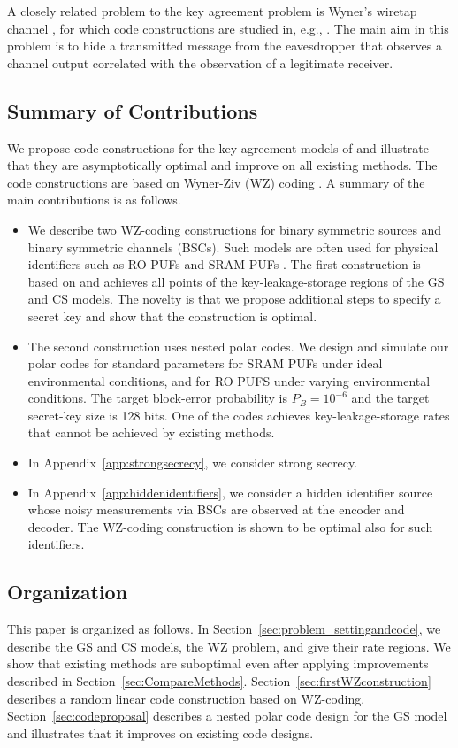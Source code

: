\documentclass[journal,10pt,twoside]{IEEEtran}
\begin{document}
A closely related problem to the key agreement problem is Wyner's wiretap channel \cite{WynerWTC}, for which code constructions are studied in, e.g., \cite{WTCpolarVardy,KliewerWTC,OzanWTC}. The main aim in this problem is to hide a transmitted message from the eavesdropper that observes a channel output correlated with the observation of a legitimate receiver. 

\subsection{Summary of Contributions}
We propose code constructions for the key agreement models of \cite{IgnaTrans,LaiTrans,bizimTIFSMultipleMeasurement} and illustrate that they are asymptotically optimal and improve on all existing methods. The code constructions are based on Wyner-Ziv (WZ) coding \cite{WZratedistortion}. A summary of the main contributions is as follows.
\begin{itemize}	
	\item We describe two WZ-coding constructions for binary symmetric sources and binary symmetric channels (BSCs). Such models are often used for physical identifiers such as RO PUFs \cite{OurEntropy} and SRAM PUFs \cite{maes2009soft}. The first construction is based on \cite{lossysourcecoding} and achieves all points of the key-leakage-storage regions of the GS and CS models. The novelty is that we propose additional steps to specify a secret key and show that the construction is optimal.     
	\item The second construction uses nested polar codes. We design and simulate our polar codes for standard parameters for SRAM PUFs under ideal environmental conditions, and for RO PUFS under varying environmental conditions. The target block-error probability is $P_B=10^{-6}$ and the target secret-key size is 128 bits. One of the codes achieves key-leakage-storage rates that cannot be achieved by existing methods.
	\item In Appendix~\ref{app:strongsecrecy}, we consider strong secrecy.
	\item In Appendix~\ref{app:hiddenidentifiers}, we consider a hidden identifier source whose noisy measurements via BSCs are observed at the encoder and decoder. The WZ-coding construction is shown to be optimal also for such identifiers.
\end{itemize}

\subsection{Organization}
This paper is organized as follows. In Section~\ref{sec:problem_settingandcode}, we describe the GS and CS models, the WZ problem, and give their rate regions. We show that existing methods are suboptimal even after applying improvements described in Section~\ref{sec:CompareMethods}. Section~\ref{sec:firstWZconstruction} describes a random linear code construction based on WZ-coding. Section~\ref{sec:codeproposal} describes a nested polar code design for the GS model and illustrates that it improves on existing code designs.
\end{document}
